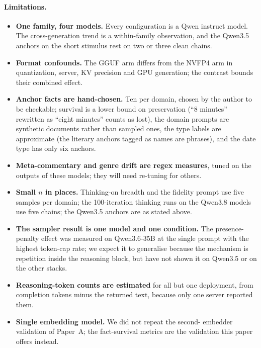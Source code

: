 \documentclass[11pt]{article}
\begin{document}
\paragraph{Limitations.}
\begin{itemize}[leftmargin=*]
  \item \textbf{One family, four models.} Every configuration is a Qwen
        instruct model. The cross-generation trend is a within-family
        observation, and the Qwen3.5 anchors on the short stimulus rest on
        two or three clean chains.
  \item \textbf{Format confounds.} The GGUF arm differs from the NVFP4 arm
        in quantization, server, KV precision and GPU generation; the
        contrast bounds their combined effect.
  \item \textbf{Anchor facts are hand-chosen.} Ten per domain, chosen by the
        author to be checkable; survival is a lower bound on preservation
        (``8 minutes'' rewritten as ``eight minutes'' counts as lost), the
        domain prompts are synthetic documents rather than sampled ones, the
        type labels are approximate (the literary anchors tagged as names are
        phrases), and the date type has only six anchors.
  \item \textbf{Meta-commentary and genre drift are regex measures}, tuned
        on the outputs of these models; they will need re-tuning for others.
  \item \textbf{Small $n$ in places.} Thinking-on breadth and the fidelity
        prompt use five samples per domain; the 100-iteration thinking runs
        on the Qwen3.8 models use five chains; the Qwen3.5 anchors are as
        stated above.
  \item \textbf{The sampler result is one model and one condition.} The
        presence-penalty effect was measured on Qwen3.6-35B at the single
        prompt with the highest token-cap rate; we expect it to generalise
        because the mechanism is repetition inside the reasoning block, but
        have not shown it on Qwen3.5 or on the other stacks.
  \item \textbf{Reasoning-token counts are estimated} for all but one
        deployment, from completion tokens minus the returned text, because
        only one server reported them.
  \item \textbf{Single embedding model.} We did not repeat the second-
        embedder validation of Paper~A; the fact-survival metrics are the
        validation this paper offers instead.
\end{itemize}
\end{document}
